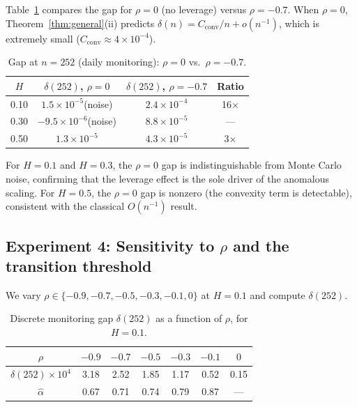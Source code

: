 \documentclass[12pt]{article}
\theoremstyle{definition}
\begin{document}
Table~\ref{tab:rho0} compares the gap for $\rho = 0$
(no leverage) versus $\rho = -0.7$.
When $\rho = 0$, Theorem~\ref{thm:general}(ii) predicts
$\delta(n) = C_{\mathrm{conv}}/n + o(n^{-1})$, which is extremely
small ($C_{\mathrm{conv}} \approx 4 \times 10^{-4}$).

\begin{table}[htbp]
\centering
\caption{Gap at $n = 252$ (daily monitoring):
$\rho = 0$ vs.\ $\rho = -0.7$.}
\label{tab:rho0}
\begin{tabular}{cccc}
\toprule
$H$ & $\delta(252)$, $\rho\!=\!0$ & $\delta(252)$, $\rho\!=\!{-0.7}$
    & Ratio \\
\midrule
0.10 & $1.5 \times 10^{-5}$\;(noise) & $2.4 \times 10^{-4}$ & 16$\times$ \\
0.30 & $-9.5 \times 10^{-6}$\;(noise) & $8.8 \times 10^{-5}$ & --- \\
0.50 & $1.3 \times 10^{-5}$ & $4.3 \times 10^{-5}$ & 3$\times$ \\
\bottomrule
\end{tabular}
\end{table}

For $H = 0.1$ and $H = 0.3$, the $\rho = 0$ gap is indistinguishable
from Monte Carlo noise, confirming that the leverage effect is
the sole driver of the anomalous scaling.
For $H = 0.5$, the $\rho = 0$ gap is nonzero (the convexity
term is detectable), consistent with the classical $O(n^{-1})$ result.

\subsection{Experiment 4: Sensitivity to $\rho$ and the transition
threshold}\label{sec:exp4}

We vary $\rho \in \{-0.9, -0.7, -0.5, -0.3, -0.1, 0\}$ at $H = 0.1$
and compute $\delta(252)$.

\begin{table}[htbp]
\centering
\caption{Discrete monitoring gap $\delta(252)$ as a function of
$\rho$, for $H = 0.1$.}
\label{tab:rho-sensitivity}
\begin{tabular}{ccccccc}
\toprule
$\rho$ & $-0.9$ & $-0.7$ & $-0.5$ & $-0.3$ & $-0.1$ & $0$ \\
\midrule
$\delta(252)\times 10^{4}$ &
  3.18 & 2.52 & 1.85 & 1.17 & 0.52 & 0.15 \\
$\hat\alpha$ &
  0.67 & 0.71 & 0.74 & 0.79 & 0.87 & --- \\
\bottomrule
\end{tabular}
\end{table}
\end{document}
